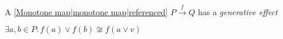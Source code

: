 

A \ref{Monotone map|monotone map|referenced} $P \xrightarrow{f} Q$ has a \emph{generative effect}

$\exists a,b \in P: f(a) \lor f(b) \not\cong f(a \lor v)$
